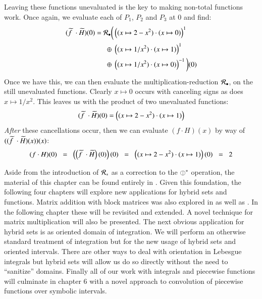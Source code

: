 Leaving these functions unevaluated is the key to making non-total functions work.
Once again, we evaluate each of $P_1$, $P_2$ and $P_3$ at 0 and find:
\begin{align*}
	(\pseudo{f\;} \cdot \,\pseudo{\!H})(0) = \mathcal{R}_\smallmult \bigg(
				& \left( (x \mapsto 2-x^2) \cdot (x \mapsto 0) \right)^1 \notag \\
		\oplus \;& \left( (x \mapsto 1/x^2) \cdot (x \mapsto 1) \right)^1 \notag \\
		\oplus \;& \left( (x \mapsto 1/x^2) \cdot (x \mapsto 0) \right)^{-1} 
	\bigg)(0)
\end{align*}
Once we have this, we can then evaluate the multiplication-reduction $\mathcal{R}_\smallmult$,
 on the still unevaluated functions.
Clearly $x \mapsto 0$ occurs with canceling signs as does $x \mapsto 1/x^2$.
This leaves us with the product of two unevaluated functions:
\begin{equation*}
	(\pseudo{f\;}\cdot\,\pseudo{\!H})(0) = \left((x \mapsto 2-x^2) \cdot (x \mapsto 1)\right)
\end{equation*}
\emph{After} these cancellations occur, then we can evaluate $(f \cdot H)(x)$ by way of
$((\pseudo{f\;}\cdot\,\pseudo{\!H})(x))(x)$:
\begin{align*}
	(f \cdot H)(0) 
		\;\;=\;\; \left(\left(\pseudo{f\;} \cdot \,\pseudo{\!H}\right)(0)\right)(0) 
		\;\;=\;\; \left((x \mapsto 2-x^2) \cdot (x \mapsto 1)\right)(0)
		\;\;=\;\; 2
\end{align*}


Aside from the introduction of $\R[\op]$ as a correction to the $\obar^\op$ operation, 
the material of this chapter can be found entirely in \cite{carette2010}.
Given this foundation, the following four chapters will explore new applications for hybrid sets and functions.
Matrix addition with block matrices was also explored in \cite{carette2010} as well as \cite{sexton2008abstract}.
In the following chapter these will be revisited and extended. 
A novel technique for matrix multiplication will also be presented.
The next obvious application for hybrid sets is as oriented domain of integration.
We will perform an otherwise standard treatment of integration but for the new usage of hybrid sets and oriented intervals.
There are other ways to deal with orientation in Lebesgue integrals but hybrid sets will allow us do so directly without 
the need to ``sanitize'' domains.
Finally all of our work with integrals and piecewise functions will culminate in chapter 6 with a novel approach to 
convolution of piecewise functions over symbolic intervals.






